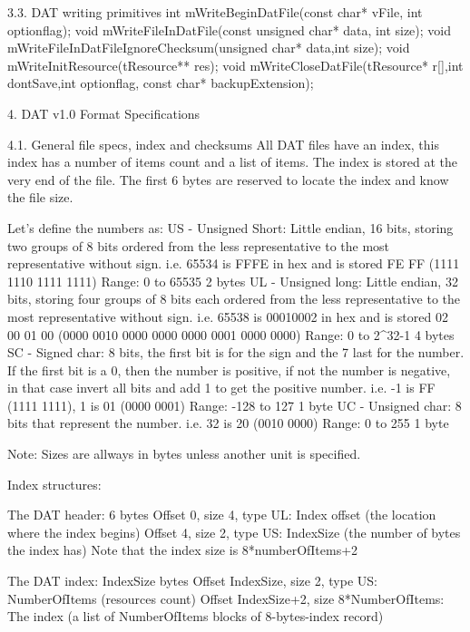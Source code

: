 3.3. DAT writing primitives
 int  mWriteBeginDatFile(const char* vFile, int optionflag);
 void mWriteFileInDatFile(const unsigned char* data, int size);
 void mWriteFileInDatFileIgnoreChecksum(unsigned char* data,int size);
 void mWriteInitResource(tResource** res);
 void mWriteCloseDatFile(tResource* r[],int dontSave,int optionflag, const
      char* backupExtension);


4. DAT v1.0 Format Specifications
   ~~~ ~~~~ ~~~~~~ ~~~~~~~~~~~~~~

4.1. General file specs, index and checksums
 All DAT files have an index, this index has a number of items count and
 a list of items.
 The index is stored at the very end of the file.
 The first 6 bytes are reserved to locate the index and know the file size.

 Let's define the numbers as:
  US - Unsigned Short: Little endian, 16 bits, storing two groups of 8 bits
       ordered from the less representative to the most representative
       without sign.
       i.e. 65534 is FFFE in hex and is stored FE FF (1111 1110  1111 1111)
       Range: 0 to 65535
       2 bytes
  UL - Unsigned long: Little endian, 32 bits, storing four groups of 8 bits
       each ordered from the less representative to the most representative
       without sign.
       i.e. 65538 is 00010002 in hex and is stored 02 00 01 00
       (0000 0010  0000 0000  0000 0001  0000 0000)
       Range: 0 to 2^32-1
       4 bytes
  SC - Signed char: 8 bits, the first bit is for the sign and the 7 last
       for the number. If the first bit is a 0, then the number is
       positive, if not the number is negative, in that case invert all
       bits and add 1 to get the positive number.
       i.e. -1 is FF (1111 1111), 1 is 01 (0000 0001)
       Range: -128 to 127
       1 byte
  UC - Unsigned char: 8 bits that represent the number.
       i.e. 32 is 20 (0010 0000)
       Range: 0 to 255
       1 byte

 Note: Sizes are allways in bytes unless another unit is specified.

 Index structures:

 The DAT header: 6 bytes
  Offset 0, size 4, type UL: Index offset (the location where the index
                             begins)
  Offset 4, size 2, type US: IndexSize (the number of bytes the index has)
                             Note that the index size is 8*numberOfItems+2

 The DAT index: IndexSize bytes
  Offset IndexSize, size 2, type US: NumberOfItems (resources count)
  Offset IndexSize+2, size 8*NumberOfItems: The index (a list of
                             NumberOfItems blocks of 8-bytes-index record)

